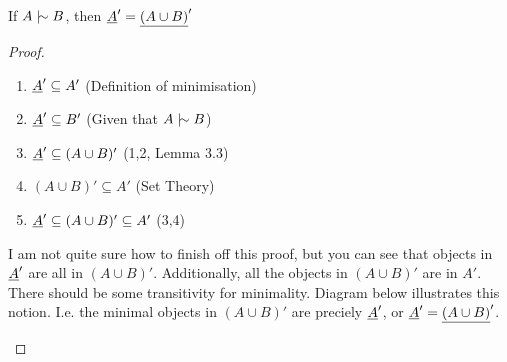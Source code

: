 \documentclass[11pt]{article}
\begin{document}
\begin{lemma}
  If $A \twiddle B$, then $\underline{A}' = \underline{(A \cup B)}'$
\end{lemma}

\begin{proof}
  \begin{enumerate}
    \item $\underline{A}' \subseteq A'$ \hfill (Definition of minimisation)
    \item $\underline{A}' \subseteq B'$ \hfill (Given that $A \twiddle B$)
    \item $\underline{A}' \subseteq (A \cup B)'$ \hfill (1,2, Lemma 3.3)
    \item $(A \cup B)' \subseteq A'$ \hfill (Set Theory)
    \item $\underline{A}' \subseteq (A \cup B)' \subseteq A'$ \hfill (3,4)
  \end{enumerate}
  I am not quite sure how to finish off this proof, but you can see that objects in $\underline{A}'$ are all in $(A\cup B)'$. Additionally, all the objects in $(A\cup B)'$ are in $A'$. There should be some transitivity for minimality. Diagram below illustrates this notion. I.e. the minimal objects in $(A \cup B)'$ are preciely $\underline{A}'$, or $\underline{A}' = \underline{(A\cup B)}'$.
  \begin{center}
  \end{center}
\end{proof}


\end{document}
